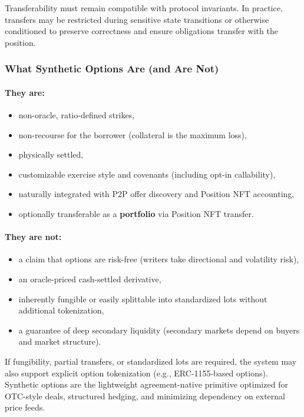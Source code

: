 \documentclass[version=preprint]{iacrcc}
\begin{document}
Transferability must remain compatible with protocol invariants. In practice, transfers may be restricted during sensitive state transitions or otherwise conditioned to preserve correctness and ensure obligations transfer with the position.

\subsubsection{What Synthetic Options Are (and Are Not)}

\paragraph{They are:}
\begin{itemize}
  \item non-oracle, ratio-defined strikes,
  \item non-recourse for the borrower (collateral is the maximum loss),
  \item physically settled,
  \item customizable exercise style and covenants (including opt-in callability),
  \item naturally integrated with P2P offer discovery and Position NFT accounting,
  \item optionally transferable as a \textbf{portfolio} via Position NFT transfer.
\end{itemize}

\paragraph{They are not:}
\begin{itemize}
  \item a claim that options are risk-free (writers take directional and volatility risk),
  \item an oracle-priced cash-settled derivative,
  \item inherently fungible or easily splittable into standardized lots without additional tokenization,
  \item a guarantee of deep secondary liquidity (secondary markets depend on buyers and market structure).
\end{itemize}

If fungibility, partial transfers, or standardized lots are required, the system may also support explicit option tokenization (e.g., ERC-1155-based options). Synthetic options are the lightweight agreement-native primitive optimized for OTC-style deals, structured hedging, and minimizing dependency on external price feeds.
\end{document}
